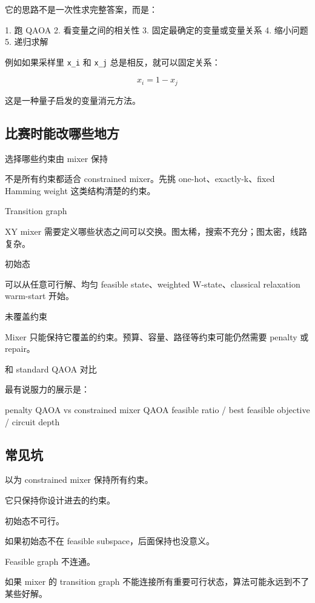 \documentclass[UTF8,12pt,a4paper]{ctexart}
\begin{document}
它的思路不是一次性求完整答案，而是：

\begin{GuideVerbatim}
1. 跑 QAOA
2. 看变量之间的相关性
3. 固定最确定的变量或变量关系
4. 缩小问题
5. 递归求解
\end{GuideVerbatim}

例如如果采样里 \texttt{x\_i} 和 \texttt{x\_j} 总是相反，就可以固定关系：

\[
x_{i} = 1 - x_{j}
\]

这是一种量子启发的变量消元方法。

\subsection*{比赛时能改哪些地方}

选择哪些约束由 mixer 保持

不是所有约束都适合 constrained mixer。先挑 one-hot、exactly-k、fixed Hamming weight 这类结构清楚的约束。

Transition graph

XY mixer 需要定义哪些状态之间可以交换。图太稀，搜索不充分；图太密，线路复杂。

初始态

可以从任意可行解、均匀 feasible state、weighted W-state、classical relaxation warm-start 开始。

未覆盖约束

Mixer 只能保持它覆盖的约束。预算、容量、路径等约束可能仍然需要 penalty 或 repair。

和 standard QAOA 对比

最有说服力的展示是：

\begin{GuideVerbatim}
penalty QAOA vs constrained mixer QAOA
feasible ratio / best feasible objective / circuit depth
\end{GuideVerbatim}

\subsection*{常见坑}

以为 constrained mixer 保持所有约束。

它只保持你设计进去的约束。

初始态不可行。

如果初始态不在 feasible subspace，后面保持也没意义。

Feasible graph 不连通。

如果 mixer 的 transition graph 不能连接所有重要可行状态，算法可能永远到不了某些好解。
\end{document}
